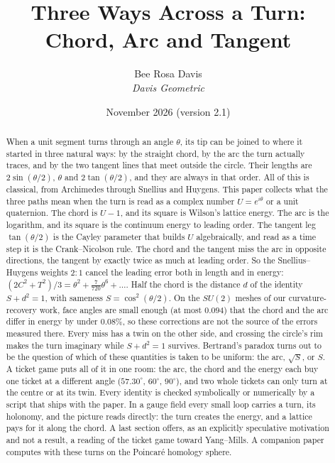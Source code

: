 \documentclass[11pt]{article}
\title{Three Ways Across a Turn:\\ Chord, Arc and Tangent}
\author{Bee Rosa Davis\\[1pt] {\normalsize\upshape\itshape Davis Geometric}}
\date{November 2026 (version 2.1)}
\begin{document}
\maketitle

\begin{abstract}
When a unit segment turns through an angle $\theta$, its tip can be joined to where it
started in three natural ways: by the straight chord, by the arc the turn actually
traces, and by the two tangent lines that meet outside the circle. Their lengths are
$2\sin(\theta/2)$, $\theta$ and $2\tan(\theta/2)$, and they are always in that order. All
of this is classical, from Archimedes through Snellius and Huygens. This paper collects
what the three paths mean when the turn is read as a complex number $U=e^{i\theta}$ or a
unit quaternion. The chord is $U-1$, and its square is Wilson's lattice energy. The arc is
the logarithm, and its square is the continuum energy to leading order. The tangent leg $\tan(\theta/2)$ is
the Cayley parameter that builds $U$ algebraically, and read as a time step it is the
Crank--Nicolson rule. The chord and the tangent miss the arc in opposite directions, the
tangent by exactly twice as much at leading order. So the Snellius--Huygens weights
$2{:}1$ cancel the leading error both in length and in energy: $(2C^2+T^2)/3=\theta^2+
\tfrac{7}{720}\theta^6+\dots$. Half the chord is the distance $d$ of the identity $S+d^2=1$,
with sameness $S=\cos^2(\theta/2)$. On the $SU(2)$ meshes of our curvature-recovery work,
face angles are small enough (at most $0.094$) that the chord and the arc differ in energy
by under $0.08\%$, so these corrections are not the source of the errors measured there.
Every miss has a twin on the other side, and crossing the circle's rim makes the turn
imaginary while $S+d^2=1$ survives. Bertrand's paradox turns out to be the question of
which of these quantities is taken to be uniform: the arc, $\sqrt S$, or $S$.
A ticket game puts all of it in one room: the arc, the chord and the energy each buy one ticket at a different angle ($57.30^\circ$, $60^\circ$, $90^\circ$), and two whole tickets can only turn at the centre or at its twin.
Every identity is checked symbolically or numerically by a script that ships with the paper.
In a gauge field every small loop carries a turn, its holonomy, and the picture reads
directly: the turn creates the energy, and a lattice pays for it along the chord. A last section
offers, as an explicitly speculative motivation and not a result, a reading of the ticket game toward
Yang--Mills. A companion paper computes with these turns on the Poincar\'e homology sphere.
\end{abstract}
\end{document}
